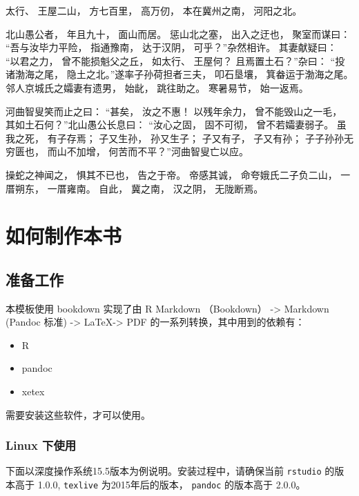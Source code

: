 \documentclass[doctor,openright,twoside]{sjtuthesis}
\providecommand{\tightlist}{%
    \setlength{\itemsep}{0pt}\setlength{\parskip}{0pt}}
\newcommand{\passthrough}[1]{#1}
\theoremstyle{plain}
\theoremstyle{definition}
\theoremstyle{remark}
\theoremstyle{ocrenumbox}
\theoremstyle{plain}
\newcommand\cqh{“}
\newcommand\cqt{”}
\begin{document}
太行、 王屋二山， 方七百里， 高万仞， 本在冀州之南， 河阳之北。

北山愚公者， 年且九十， 面山而居。 惩山北之塞， 出入之迂也，
聚室而谋曰： \cqh 吾与汝毕力平险， 指通豫南， 达于汉阴，
可乎？\cqt  杂然相许。 其妻献疑曰： \cqh 以君之力， 曾不能损魁父之丘，
如太行、 王屋何？ 且焉置土石？\cqt  杂曰： \cqh 投诸渤海之尾，
隐土之北。\cqt  遂率子孙荷担者三夫， 叩石垦壤， 箕畚运于渤海之尾。
邻人京城氏之孀妻有遗男， 始龀， 跳往助之。 寒暑易节， 始一返焉。

河曲智叟笑而止之曰： \cqh 甚矣， 汝之不惠！ 以残年余力，
曾不能毁山之一毛， 其如土石何？\cqt  北山愚公长息曰： \cqh 汝心之固，
固不可彻， 曾不若孀妻弱子。 虽我之死， 有子存焉； 子又生孙， 孙又生子；
子又有子， 子又有孙； 子子孙孙无穷匮也， 而山不加增，
何苦而不平？\cqt  河曲智叟亡以应。

操蛇之神闻之， 惧其不已也， 告之于帝。 帝感其诚， 命夸娥氏二子负二山，
一厝朔东， 一厝雍南。 自此， 冀之南， 汉之阴， 无陇断焉。

\hypertarget{chap:makebook}{%
\chapter{如何制作本书}\label{chap:makebook}}

\section{准备工作}

本模板使用 bookdown 实现了由 R Markdown （Bookdown） -\textgreater{}
Markdown (Pandoc 标准) -\textgreater{} \LaTeX -\textgreater{} PDF
的一系列转换，其中用到的依赖有：

\begin{itemize}
\tightlist
\item
  R
\item
  pandoc
\item
  xetex
\end{itemize}

需要安装这些软件，才可以使用。

\hypertarget{linux-}{%
\subsection{Linux 下使用}\label{linux-}}

下面以深度操作系统15.5版本为例说明。安装过程中，请确保当前
\passthrough{\lstinline!rstudio!} 的版本高于 1.0.0,
\passthrough{\lstinline!texlive!} 为2015年后的版本，
\passthrough{\lstinline!pandoc!} 的版本高于 2.0.0。
\end{document}
